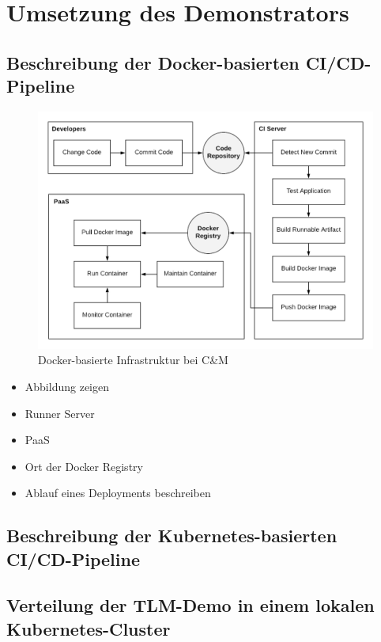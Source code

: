 \chapter{Umsetzung des Demonstrators}

\section{Beschreibung der Docker-basierten CI/CD-Pipeline}

\begin{figure}[h]
	\centering
	\includegraphics[width=\textwidth]{images/aktuelleInfrastruktur}
	\caption{Docker-basierte Infrastruktur bei C\&M}
	\label{fig:lokalesCluster}
\end{figure}

\begin{itemize}
	\item Abbildung zeigen
	\item Runner Server
	\item PaaS
	\item Ort der Docker Registry
	\item Ablauf eines Deployments beschreiben
\end{itemize}

\section{Beschreibung der Kubernetes-basierten CI/CD-Pipeline}

\section{Verteilung der TLM-Demo in einem lokalen Kubernetes-Cluster}

